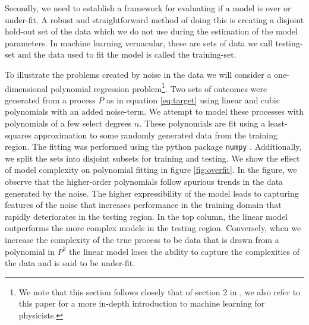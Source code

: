 Secondly, we need to establish a framework for evaluating if a model is over or under-fit. A robust and straightforward method of doing this is creating a disjoint hold-out set of the data which we do not use during the estimation of the model parameters. In machine learning vernacular, these are sets of data we call testing-set and the data used to fit the model is called the training-set. 

To illustrate the problems created by noise in the data we will consider a one-dimensional polynomial regression problem\footnote{We note that this section follows closely that of section 2 in \citet{Mehta2019}, we also refer to this paper for a more in-depth introduction to machine learning for physicists.}. Two sets of outcomes were generated from a process $P$ as in equation \ref{eq:target} using linear and cubic polynomials with an added noise-term. We attempt to model these processes with polynomials of a few select degrees $n$. These polynomials are fit using a least-squares approximation to some randomly generated data from the training region. The fitting was performed using the python package \lstinline{numpy} \cite{numpy}. Additionally, we split the sets into disjoint subsets for training and testing. We show the effect of model complexity on polynomial fitting in figure \ref{fig:overfit}. In the figure, we observe that the higher-order polynomials follow spurious trends in the data generated by the noise. The higher expressibility of the model leads to capturing features of the noise that increases performance in the training domain that rapidly deteriorates in the testing region. In the top column, the linear model outperforms the more complex models in the testing region. Conversely, when we increase the complexity of the true process to be data that is drawn from a polynomial in $P^3$ the linear model loses the ability to capture the complexities of the data and is said to be under-fit.  


